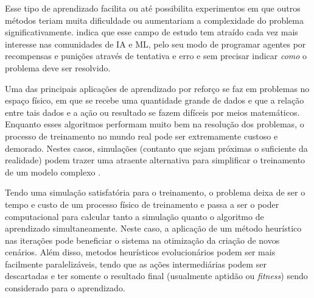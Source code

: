
Esse tipo de aprendizado facilita ou at{\'e} possibilita experimentos
em que outros m{\'e}todos teriam muita dificuldade ou aumentariam a
complexidade do problema significativamente.
 indica que esse campo de estudo
tem atra{\'i}do cada vez mais interesse nas comunidades de IA e ML,
pelo seu modo de programar agentes por recompensas e puni{\c c}{\~o}es
atrav{\'e}s de tentativa e erro e sem precisar indicar \textit{como} o
problema deve ser resolvido.

Uma das principais aplica{\c c}{\~o}es de aprendizado por refor{\c c}o
se faz em problemas no espa{\c c}o f{\'i}sico, em que se recebe uma
quantidade grande de dados e que a rela{\c c}{\~a}o entre tais dados e
a a{\c c}{\~a}o ou resultado se fazem dif{\'i}ceis por meios
matem{\'a}ticos. Enquanto esses algoritmos performam muito bem na
resolu{\c c}{\~a}o dos problemas, o processo de treinamento no mundo
real pode ser extremamente custoso e demorado. Nestes casos, simula{\c
  c}{\~o}es (contanto que sejam pr{\'o}ximas o suficiente da
realidade) podem trazer uma atraente alternativa para simplificar o
treinamento de um modelo complexo \cite{Rao_2020_CVPR}.

Tendo uma simula{\c c}{\~a}o satisfat{\'o}ria para o treinamento, o
problema deixa de ser o tempo e custo de um processo f{\'i}sico de
treinamento e passa a ser o poder computacional para calcular tanto a
simula{\c c}{\~a}o quanto o algoritmo de aprendizado simultaneamente.
Neste caso, a aplica{\c c}{\~a}o de um m{\'e}todo heur{\'i}stico nas
itera{\c c}{\~o}es pode beneficiar o sistema na otimiza{\c c}{\~a}o da
cria{\c c}{\~a}o de novos cen{\'a}rios. Al{\'e}m disso, metodos
heur{\'i}sticos evolucion{\'a}rios podem ser mais facilmente
paraleliz{\'a}veis, tendo que as a{\c c}{\~o}es intermedi{\'a}rias
podem ser descartadas e ter somente o resultado final (usualmente
aptid{\~a}o ou \textit{fitness}) sendo considerado para o aprendizado.

